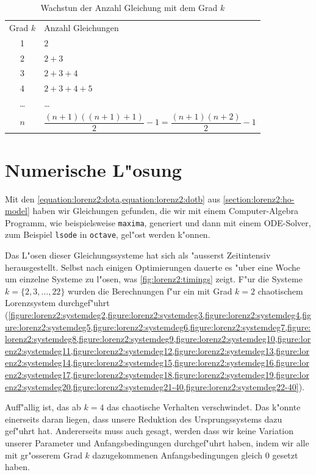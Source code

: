 \begin{refsection}
\begin{table}
	\centering
	\begin{tabular}{c | l}
		Grad $k$ & Anzahl Gleichungen \\
		1 & $2$ \\
		2 & $2 + 3$ \\
		3 & $2 + 3 + 4$\\
		4 & $2 + 3 + 4 + 5$\\
		\dots & \dots \\
		$n$ & $\dfrac{(n + 1)((n + 1) + 1)}{2} - 1
		= \dfrac{(n + 1)(n + 2)}{2} - 1$
	\end{tabular}
	\caption{Wachstun der Anzahl Gleichung mit dem Grad $k$}
	\label{table:lorenz2:degree}
\end{table}

\section{Numerische L"osung\label{section:lorenz2:numeric-solution}}
Mit den \cref{equation:lorenz2:dota,equation:lorenz2:dotb} aus 
\cref{section:lorenz2:ho-model} haben wir Gleichungen gefunden, die wir 
mit einem Computer-Algebra Programm, wie beispielsweise \texttt{maxima}, 
generiert und dann mit einem ODE-Solver, zum Beispiel \texttt{lsode} in 
\texttt{octave}, gel"ost werden k"onnen.

Das L"osen dieser Gleichungssysteme hat sich als "ausserst Zeitintensiv 
herausgestellt. Selbst nach einigen Optimierungen dauerte es "uber eine Woche 
um einzelne Systeme zu l"osen, was \cref{fig:lorenz2:timings} zeigt. F"ur die 
Systeme $k = \{2,3,\dots,22\}$ wurden die Berechnungen f"ur ein mit Grad $k = 
2$ chaotischem Lorenzsystem durchgef"uhrt 
(\cref{figure:lorenz2:systemdeg2,figure:lorenz2:systemdeg3,figure:lorenz2:systemdeg4,figure:lorenz2:systemdeg5,figure:lorenz2:systemdeg6,figure:lorenz2:systemdeg7,figure:lorenz2:systemdeg8,figure:lorenz2:systemdeg9,figure:lorenz2:systemdeg10,figure:lorenz2:systemdeg11,figure:lorenz2:systemdeg12,figure:lorenz2:systemdeg13,figure:lorenz2:systemdeg14,figure:lorenz2:systemdeg15,figure:lorenz2:systemdeg16,figure:lorenz2:systemdeg17,figure:lorenz2:systemdeg18,figure:lorenz2:systemdeg19,figure:lorenz2:systemdeg20,figure:lorenz2:systemdeg21-40,figure:lorenz2:systemdeg22-40}).

Auff"allig ist, das ab $k = 4$ das chaotische Verhalten verschwindet. Das 
k"onnte einerseits daran liegen, dass unsere Reduktion des Ursprungssystems 
dazu gef"uhrt hat. Andererseits muss auch gesagt, werden dass wir keine 
Variation unserer Parameter und Anfangsbedingungen durchgef"uhrt haben, indem 
wir alle mit gr"osserem Grad $k$ dazugekommenen Anfangsbedingungen gleich 0 
gesetzt haben.


\end{refsection}
